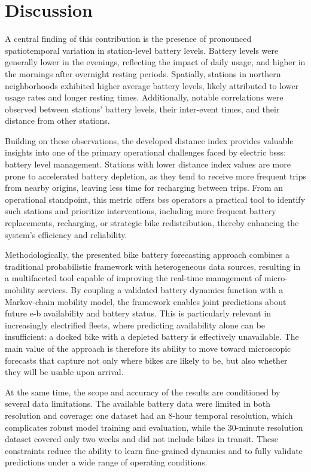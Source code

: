 \section{Discussion}
\label{sec:disc_battery}

A central finding of this contribution is the presence of pronounced spatiotemporal variation in station-level battery levels. Battery levels were generally lower in the evenings, reflecting the impact of daily usage, and higher in the mornings after overnight resting periods. Spatially, stations in northern neighborhoods exhibited higher average battery levels, likely attributed to lower usage rates and longer resting times. Additionally, notable correlations were observed between stations' battery levels, their inter-event times, and their distance from other stations.

Building on these observations, the developed distance index provides valuable insights into one of the primary operational challenges faced by electric \acp{bss}: battery level management. Stations with lower distance index values are more prone to accelerated battery depletion, as they tend to receive more frequent trips from nearby origins, leaving less time for recharging between trips. From an operational standpoint, this metric offers \ac{bss} operators a practical tool to identify such stations and prioritize interventions, including more frequent battery replacements, recharging, or strategic bike redistribution, thereby enhancing the system's efficiency and reliability.

Methodologically, the presented bike battery forecasting approach combines a traditional probabilistic framework with heterogeneous data sources, resulting in a multifaceted tool capable of improving the real-time management of micro-mobility services. By coupling a validated battery dynamics function with a Markov-chain mobility model, the framework enables joint predictions about future \ac{e-b} availability and battery status. This is particularly relevant in increasingly electrified fleets, where predicting availability alone can be insufficient: a docked bike with a depleted battery is effectively unavailable. The main value of the approach is therefore its ability to move toward microscopic forecasts that capture not only where bikes are likely to be, but also whether they will be usable upon arrival.

At the same time, the scope and accuracy of the results are conditioned by several data limitations. The available battery data were limited in both resolution and coverage: one dataset had an 8-hour temporal resolution, which complicates robust model training and evaluation, while the 30-minute resolution dataset covered only two weeks and did not include bikes in transit. These constraints reduce the ability to learn fine-grained dynamics and to fully validate predictions under a wide range of operating conditions.

